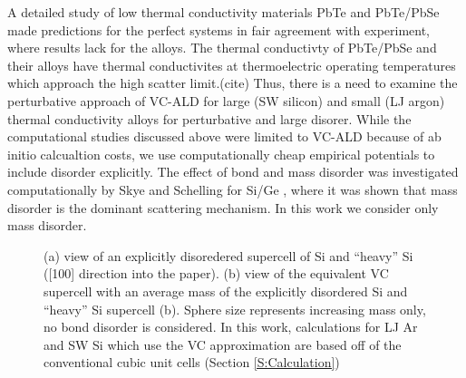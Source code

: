 \documentclass[aps,prb,twocolumn,superscriptaddress,amsmath,amssymb,floatfix]{revtex4}
\begin{document}
A detailed study of low thermal conductivity materials 
PbTe\cite{shiga_microscopic_2012} and PbTe/PbSe\cite{tian_phonon_2012} 
made predictions for the perfect systems in fair agreement with 
experiment, where results lack for the alloys. The thermal conductivty 
of PbTe/PbSe and their alloys have thermal conductivites at thermoelectric 
operating temperatures which approach the high scatter limit.(cite) 
Thus, there is a need to examine the perturbative approach of 
VC-ALD for large (SW silicon) and small (LJ argon) 
thermal conductivity alloys for perturbative and large disorer. 
While the computational studies discussed above were limited to VC-ALD 
because of ab initio calcualtion costs, we use computationally 
cheap empirical potentials to include disorder explicitly. 
The effect of bond and mass disorder was investigated computationally 
by Skye and 
Schelling for Si/Ge \cite{skye_thermal_2008}, 
where it was shown that mass disorder is 
the dominant scattering mechanism. In this work we consider only 
mass disorder.

% 

\begin{figure}
\begin{center}
\mbox{}
\vspace*{0mm}
\end{center}
\caption{\label{F:supercells} 
(a) view of an explicitly disoredered supercell of 
Si and ``heavy'' Si ([100] direction into the paper).
\cite{momma_vesta:_2008} 
(b) view of the equivalent VC supercell 
with an average
mass of the explicitly disordered Si and ``heavy'' Si supercell 
(b). 
Sphere size represents 
increasing mass 
only, no bond disorder is considered. 
In this work, calculations for LJ Ar and SW Si which use the VC 
approximation 
are based off of the conventional cubic unit cells 
(Section \ref{S:Calculation}) 
}
\end{figure}
\end{document}
